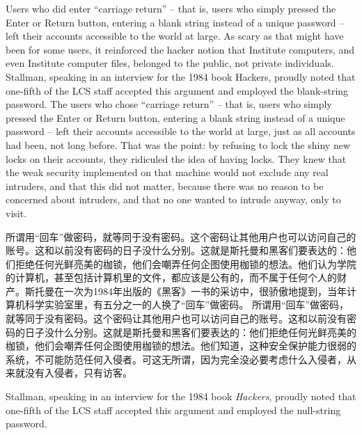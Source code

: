 \ifdefined\eng
\ifdefined\vone
Users who did enter ``carriage return'' -- that is, users who simply pressed the Enter or Return button, entering a blank string instead of a unique password -- left their accounts accessible to the world at large. As scary as that might have been for some users, it reinforced the hacker notion that Institute computers, and even Institute computer files, belonged to the public, not private individuals. Stallman, speaking in an interview for the 1984 book Hackers, proudly noted that one-fifth of the LCS staff accepted this argument and employed the blank-string password.
\fi
\ifdefined\vtwo
The users who chose ``carriage return'' -- that is, users who simply pressed the Enter or Return button, entering a blank string instead of a unique password -- left their accounts accessible to the world at large, just as all accounts had been, not long before. That was the point: by refusing to lock the shiny new locks on their accounts, they ridiculed the idea of having locks. They knew that the weak security implemented on that machine would not exclude any real intruders, and that this did not matter, because there was no reason to be concerned about intruders, and that no one wanted to intrude anyway, only to visit.
\fi
\fi

\ifdefined\chs
\ifdefined\vone
所谓用``回车''做密码，就等同于没有密码。这个密码让其他用户也可以访问自己的账号。这和以前没有密码的日子没什么分别。这就是斯托曼和黑客们要表达的：他们拒绝任何光鲜亮美的枷锁，他们会嘲弄任何企图使用枷锁的想法。他们认为学院的计算机，甚至包括计算机里的文件，都应该是公有的，而不属于任何个人的财产。斯托曼在一次为1984年出版的《黑客》一书的采访中，很骄傲地提到，当年计算机科学实验室里，有五分之一的人换了``回车''做密码。
\fi
\ifdefined\vtwo
所谓用``回车''做密码，就等同于没有密码。这个密码让其他用户也可以访问自己的账号。这和以前没有密码的日子没什么分别。这就是斯托曼和黑客们要表达的：他们拒绝任何光鲜亮美的枷锁，他们会嘲弄任何企图使用枷锁的想法。他们知道，这种安全保护能力很弱的系统，不可能防范任何入侵者。可这无所谓，因为完全没必要考虑什么入侵者，从来就没有入侵者，只有访客。
\fi
\fi

\ifdefined\vtwo
\ifdefined\eng
Stallman, speaking in an interview for the 1984 book \textit{Hackers}, proudly noted that one-fifth of the LCS staff accepted this argument and employed the null-string password.
\fi

